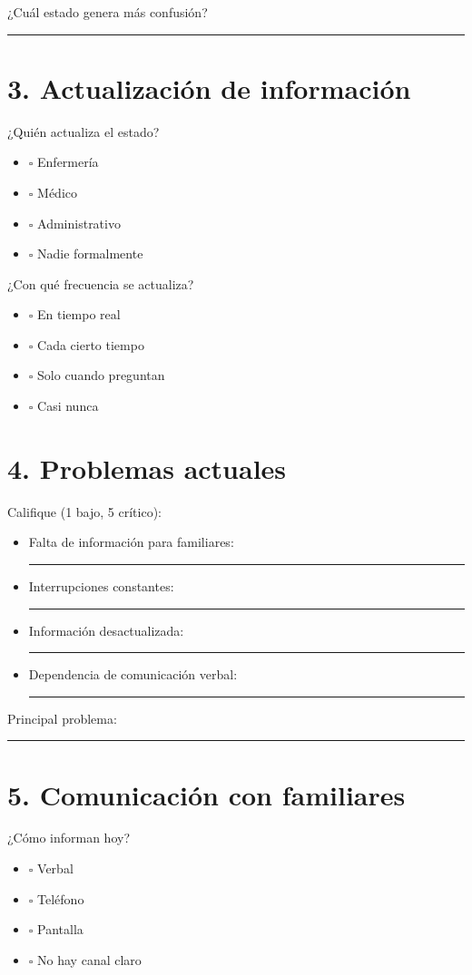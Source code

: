 \documentclass[12pt]{article}
\begin{document}
¿Cuál estado genera más confusión? \\
\rule{14cm}{0.4pt}

\section*{3. Actualización de información}
¿Quién actualiza el estado?
\begin{itemize}
    \item $\square$ Enfermería
    \item $\square$ Médico
    \item $\square$ Administrativo
    \item $\square$ Nadie formalmente
\end{itemize}

¿Con qué frecuencia se actualiza?
\begin{itemize}
    \item $\square$ En tiempo real
    \item $\square$ Cada cierto tiempo
    \item $\square$ Solo cuando preguntan
    \item $\square$ Casi nunca
\end{itemize}

\section*{4. Problemas actuales}
Califique (1 bajo, 5 crítico):

\begin{itemize}
    \item Falta de información para familiares: \rule{2cm}{0.4pt}
    \item Interrupciones constantes: \rule{2cm}{0.4pt}
    \item Información desactualizada: \rule{2cm}{0.4pt}
    \item Dependencia de comunicación verbal: \rule{2cm}{0.4pt}
\end{itemize}

Principal problema: \\
\rule{14cm}{0.4pt}

\section*{5. Comunicación con familiares}
¿Cómo informan hoy?
\begin{itemize}
    \item $\square$ Verbal
    \item $\square$ Teléfono
    \item $\square$ Pantalla
    \item $\square$ No hay canal claro
\end{itemize}
\end{document}

